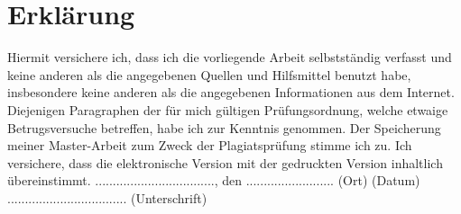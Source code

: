 \documentclass[
        ngerman,
        paper=a4,
        numbers=noendperiod,
]{scrreprt}
\begin{document}
        
        




\chapter*{Erklärung}
Hiermit versichere ich, dass ich die vorliegende Arbeit selbstständig verfasst und keine anderen als die angegebenen Quellen und Hilfsmittel benutzt habe, insbesondere keine anderen als die angegebenen Informationen aus dem Internet. Diejenigen Paragraphen der für mich gültigen Prüfungsordnung, welche etwaige Betrugsversuche betreffen, habe ich zur Kenntnis genommen. Der Speicherung meiner Master-Arbeit zum Zweck der Plagiatsprüfung stimme ich zu. Ich versichere, dass die elektronische Version mit der gedruckten Version inhaltlich übereinstimmt.\newline
\linebreak
\linebreak
\linebreak
.................................., den .........................\newline
(Ort) (Datum)\newline
\linebreak
\linebreak
\linebreak
..................................\newline
(Unterschrift)
\end{document}
